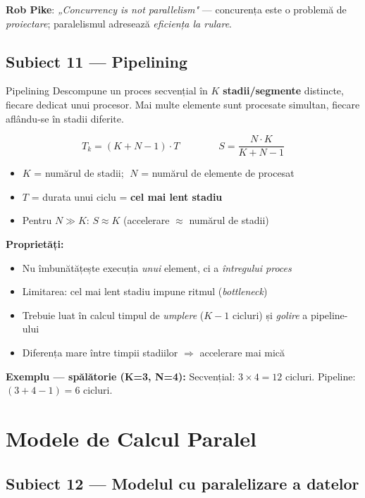 \documentclass[a4paper,11pt]{article}
\newcommand{\subiect}[2]{\subsection{Subiect \textcolor{numcol}{#1} — #2}}
\begin{document}
\textbf{Rob Pike}: \emph{„Concurrency is not parallelism"} — concurența este o problemă de \emph{proiectare}; paralelismul adresează \emph{eficiența la rulare}.

\subiect{11}{Pipelining}

\begin{defbox}{Pipelining}
Descompune un proces secvențial în $K$ \textbf{stadii/segmente} distincte, fiecare dedicat unui procesor. Mai multe elemente sunt procesate simultan, fiecare aflându-se în stadii diferite.
\end{defbox}

\begin{formulabox}
\[
T_k = (K + N - 1) \cdot T \qquad\qquad S = \frac{N \cdot K}{K + N - 1}
\]
\begin{itemize}[noitemsep]
  \item $K$ = numărul de stadii; $\;N$ = numărul de elemente de procesat
  \item $T$ = durata unui ciclu = \textbf{cel mai lent stadiu}
  \item Pentru $N \gg K$: $S \approx K$ (accelerare $\approx$ numărul de stadii)
\end{itemize}
\end{formulabox}

\textbf{Proprietăți:}
\begin{itemize}[noitemsep]
  \item Nu îmbunătățește execuția \emph{unui} element, ci a \emph{întregului proces}
  \item Limitarea: cel mai lent stadiu impune ritmul (\emph{bottleneck})
  \item Trebuie luat în calcul timpul de \emph{umplere} ($K-1$ cicluri) și \emph{golire} a pipeline-ului
  \item Diferența mare între timpii stadiilor $\Rightarrow$ accelerare mai mică
\end{itemize}

\textbf{Exemplu — spălătorie (K=3, N=4):}
Secvențial: $3 \times 4 = 12$ cicluri. \quad Pipeline: $(3 + 4 - 1) = 6$ cicluri.

\section{Modele de Calcul Paralel}

\subiect{12}{Modelul cu paralelizare a datelor}
\end{document}
